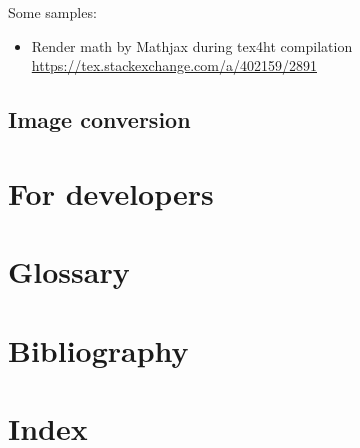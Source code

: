 \documentclass{book}
\begin{document}
Some samples:

\begin{itemize}
  \item Render math by Mathjax during tex4ht compilation \url{https://tex.stackexchange.com/a/402159/2891}
\end{itemize}
\section{Image conversion}

\chapter{For developers}


\chapter{Glossary}
\chapter{Bibliography}
\chapter{Index}
\end{document}
